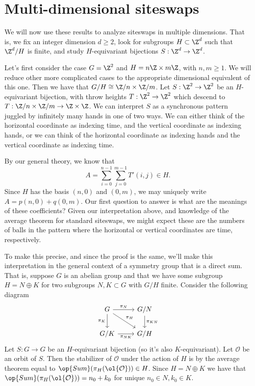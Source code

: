 \documentclass[12nt]{article}
\theoremstyle{plain}
\begin{document}
\section{Multi-dimensional siteswaps}

We will now use these results to analyze siteswaps in multiple dimensions. That is, we fix an integer dimension $d \geq 2$, look for subgroups $H \subset \Z^d$ such that $\Z^d/H$ is finite, and study $H$-equivariant bijections $S : \Z^d \to \Z^d$. 

Let's first consider the case $G = \Z^2$ and $H = n\Z \times m\Z$, with $n, m \geq 1$. We will reduce other more complicated cases to the appropriate dimensional equivalent of this one. Then we have that $G/H \cong \Z/n \times \Z/m$. Let $S : \Z^2 \to \Z^2$ be an $H$-equivariant bijection, with throw heights $T : \Z^2 \to \Z^2$ which descend to $T : \Z/n \times \Z/m \to \Z \times \Z$. We can interpret $S$ as a synchronous pattern juggled by infinitely many hands in one of two ways. We can either think of the horizontal coordinate as indexing time, and the vertical coordinate as indexing hands, or we can think of the horizontal coordinate as indexing hands and the vertical coordinate as indexing time.

By our general theory, we know that 
\[
A = \sum \limits_{i = 0}^{n-1} \sum \limits_{j=0}^{m-1} T'(i, j) \in H.
\]
Since $H$ has the basis $(n, 0)$ and  $(0, m)$, we may uniquely write $A = p(n, 0) + q(0, m)$. Our first question to answer is what are the meanings of these coefficients? Given our interpretation above, and knowledge of the average theorem for standard siteswaps, we might expect these are the numbers of balls in the pattern where the horizontal or vertical coordinates are time, respectively. 

To make this precise, and since the proof is the same, we'll make this interpretation in the general context of a symmetry group that is a direct sum. That is, suppose $G$ is an abelian group and that we have some subgroup $H = N \oplus K$ for two subgroups $N, K \subset G$ with $G/H$ finite. Consider the following diagram
\[
\begin{tikzcd}
G\ar[d, "\pi_K"'] \ar[dr, "\pi_H"] \ar[r, "\pi_N"] & G/N \ar[d, "\pi_{KN}"] \\
G/K \ar[r, "\pi_{NK}"'] & G/H
\end{tikzcd}
\]
Let $S : G \to G$ be an $H$-equivariant bijection (so it's also $K$-equivariant). Let $\mathcal{O}$ be an orbit of $S$. Then the stabilizer of $\mathcal{O}$ under the action of $H$ is by the average theorem equal to $\op{Sum}(\pi_H(\ol{\mathcal{O}})) \in H$. Since $H = N \oplus K$ we have that $\op{Sum}(\pi_H(\ol{\mathcal{O}})) = n_0 + k_0$ for unique $n_0 \in N, k_0 \in K$. 
\end{document}
